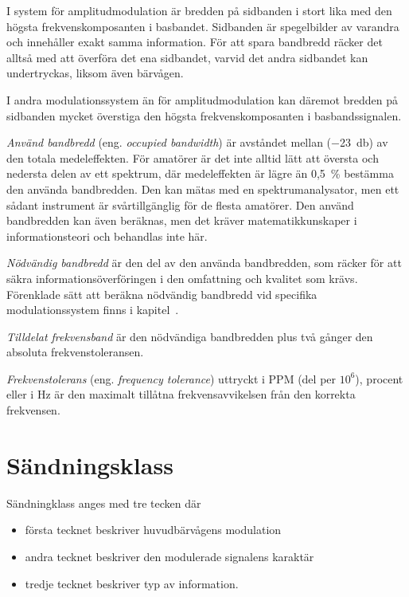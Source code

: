 I system för amplitudmodulation är bredden på sidbanden i stort lika med den
högsta frekvenskomposanten i basbandet.
Sidbanden är spegelbilder av varandra och innehåller exakt samma information.
För att spara bandbredd räcker det alltså med att överföra det ena sidbandet,
varvid det andra sidbandet kan undertryckas, liksom även bärvågen.

I andra modulationssystem än för amplitudmodulation kan däremot bredden på
sidbanden mycket överstiga den högsta frekvenskomposanten i basbandssignalen.

\emph{Använd bandbredd} (eng. \emph{occupied bandwidth}) är avståndet mellan
(\qty{-23}{\decibel}) av den totala medeleffekten.
För amatörer är det inte alltid lätt att översta och nedersta delen av ett
spektrum, där medeleffekten är lägre än 0,5~\% bestämma den använda bandbredden.
Den kan mätas med en spektrumanalysator, men ett sådant instrument är
svårtillgänglig för de flesta amatörer.
Den använd bandbredden kan även beräknas, men det kräver matematikkunskaper i
informationsteori och behandlas inte här.

\emph{Nödvändig bandbredd} är den del av den använda bandbredden, som räcker
för att säkra informationsöverföringen i den omfattning och kvalitet som krävs.
Förenklade sätt att beräkna nödvändig bandbredd vid specifika modulationssystem
finns i kapitel~.

\emph{Tilldelat frekvensband} är den nödvändiga bandbredden plus två gånger den
absoluta frekvenstoleransen.

\emph{Frekvenstolerans} (eng. \emph{frequency tolerance}) uttryckt i PPM (del
per \(10^6\)), procent eller i \unit{\hertz} är den maximalt tillåtna
frekvensavvikelsen från den korrekta frekvensen.

\section{Sändningsklass}

Sändningklass anges med tre tecken där

\begin{itemize}
\item första tecknet beskriver huvudbärvågens modulation
\item andra tecknet beskriver den modulerade signalens karaktär
\item tredje tecknet beskriver typ av information.
\end{itemize}


